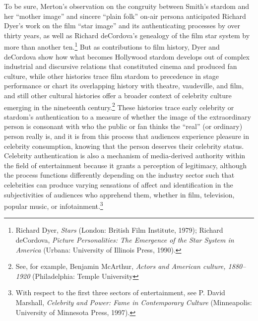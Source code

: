 \documentclass{tufte-handout}
\begin{document}
To be sure, Merton's observation on the congruity between Smith's
stardom and her ``mother image'' and sincere ``plain folk'' on-air
persona anticipated Richard Dyer's work on the film ``star image'' and
its authenticating processes by over thirty years, as well as Richard
deCordova's genealogy of the film star system by more than another
ten.\footnote{Richard Dyer, \emph{Stars} (London: British Film
  Institute, 1979); Richard deCordova, \emph{Picture Personalities: The
  Emergence of the Star System in America} (Urbana: University of
  Illinois Press, 1990).} But as contributions to film history, Dyer and
deCordova show how what becomes Hollywood stardom develops out of
complex industrial and discursive relations that constituted cinema and
produced fan culture, while other histories trace film stardom to
precedence in stage performance or chart its overlapping history with
theatre, vaudeville, and film, and still other cultural histories offer
a broader context of celebrity culture emerging in the nineteenth
century.\footnote{See, for example, Benjamin McArthur, \emph{Actors and
  American culture, 1880--1920} (Philadelphia: Temple University} These histories trace early
celebrity or stardom's authentication to a measure of whether the image
of the extraordinary person is consonant with who the public or fan
thinks the ``real'' (or ordinary) person really is, and it is from this
process that audiences experience pleasure in celebrity consumption,
knowing that the person deserves their celebrity status. Celebrity
authentication is also a mechanism of media-derived authority within the
field of entertainment because it grants a perception of legitimacy,
although the process functions differently depending on the industry
sector such that celebrities can produce varying sensations of affect
and identification in the subjectivities of audiences who apprehend
them, whether in film, television, popular music, or
infotainment.\footnote{With respect to the first three sectors of
  entertainment, see P. David Marshall, \emph{Celebrity and Power: Fame
  in Contemporary Culture} (Minneapolis: University of Minnesota Press,
  1997).}
\end{document}
